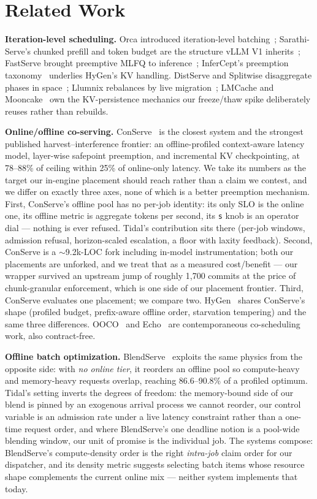 \documentclass[conference]{IEEEtran}
\newcommand{\code}[1]{\texttt{#1}}
\begin{document}
\section{Related Work}
\label{sec:related}

\textbf{Iteration-level scheduling.} Orca introduced iteration-level
batching~\citep{orca}; Sarathi-Serve's chunked prefill and token budget are the
structure vLLM V1 inherits~\citep{sarathi}; FastServe brought preemptive MLFQ to
inference~\citep{fastserve}; InferCept's preemption taxonomy~\citep{infercept} underlies
HyGen's KV handling. DistServe and Splitwise disaggregate phases in
space~\citep{distserve,splitwise}; Llumnix rebalances by live migration~\citep{llumnix};
LMCache and Mooncake~\citep{lmcache,mooncake} own the KV-persistence mechanics our
freeze/thaw spike deliberately reuses rather than rebuilds.

\textbf{Online/offline co-serving.} ConServe~\citep{conserve} is the closest system and
the strongest published harvest--interference frontier: an offline-profiled context-aware
latency model, layer-wise safepoint preemption, and incremental KV checkpointing, at
78--88\% of ceiling within 25\% of online-only latency. We take its numbers as the
target our in-engine placement should reach rather than a claim we contest, and we
differ on exactly three axes, none of which is a better preemption mechanism. First,
ConServe's offline pool has no per-job identity: its only SLO is the online one, its
offline metric is aggregate tokens per second, its \code{s} knob is an operator dial ---
nothing is ever refused. Tidal's contribution sits there (per-job windows, admission
refusal, horizon-scaled escalation, a floor with laxity feedback). Second, ConServe is a
$\sim$9.2k-LOC fork including in-model instrumentation; both our placements are
unforked, and we treat that as a measured cost/benefit --- our wrapper survived an
upstream jump of roughly 1{,}700 commits at the price of chunk-granular enforcement,
which is one side of our placement frontier. Third, ConServe evaluates one placement; we compare two.
HyGen~\citep{hygen} shares ConServe's shape (profiled budget, prefix-aware offline
order, starvation tempering) and the same three differences.
OOCO~\citep{ooco} and Echo~\citep{echo} are contemporaneous co-scheduling work, also
contract-free.

\textbf{Offline batch optimization.} BlendServe~\citep{blendserve} exploits the same
physics from the opposite side: with \emph{no online tier}, it reorders an offline pool
so compute-heavy and memory-heavy requests overlap, reaching 86.6--90.8\% of a profiled
optimum. Tidal's setting inverts the degrees of freedom: the memory-bound side of our
blend is pinned by an exogenous arrival process we cannot reorder, our control variable
is an admission rate under a live latency constraint rather than a one-time request
order, and where BlendServe's one deadline notion is a pool-wide blending window, our
unit of promise is the individual job. The systems compose: BlendServe's
compute-density order is the right \emph{intra-job} claim order for our dispatcher, and
its density metric suggests selecting batch items whose resource shape complements the
current online mix --- neither system implements that today.
\end{document}
